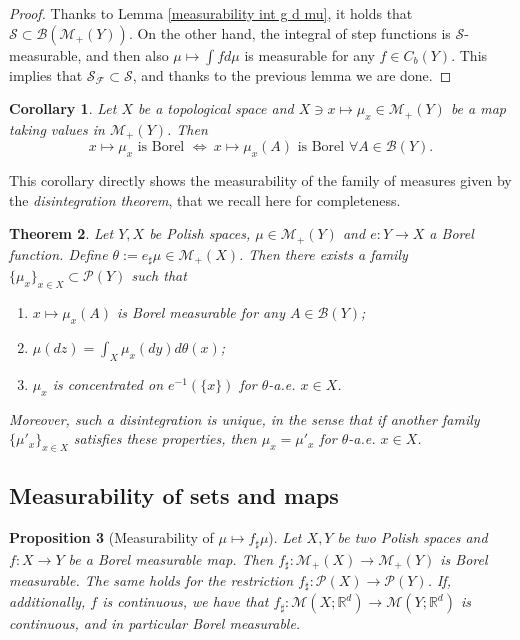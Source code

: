 \documentclass[10pt,leqno]{amsart}
\numberwithin{equation}{section}
\newtheorem{teorema}{Theorem}[section]
\newtheorem{prop}[teorema]{Proposition}
\newtheorem{co}[teorema]{Corollary}
\newcommand{\R}{\mathbb{R}}
\newcommand{\PP}{\mathcal{P}}
\begin{document}
\begin{proof}
    Thanks to Lemma \ref{measurability int g d mu}, it holds that $\mathcal{S}\subset \mathcal{B}(\mathcal{M}_+(Y))$. On the other hand, the integral of step functions is $\mathcal{S}$-measurable, and then also $\mu \mapsto \int fd\mu$ is measurable for any $f \in C_b(Y)$. This implies that $\mathcal{S}_\mathcal{F}\subset \mathcal{S}$, and thanks to the previous lemma we are done.
\end{proof}

\begin{co}\label{equiv of sigma alg cor}
    Let $X$ be a topological space and  $X \ni x \mapsto \mu_x \in \mathcal{M}_+(Y)$ be a map taking values in $\mathcal{M}_+(Y)$. Then 
    \[x\mapsto \mu_x \text{ is Borel } \iff  \ x\mapsto \mu_x(A) \text{ is Borel }\forall A\in \mathcal{B}(Y).\]
\end{co}

This corollary directly shows the measurability of the family of measures given by the \textit{disintegration theorem}, that we recall here for completeness.

\begin{teorema}\label{disintegration theorem}
    Let $Y,X$ be Polish spaces, $\mu\in \mathcal{M}_+(Y)$ and $e:Y\to X$ a Borel function. Define $\theta := e_\sharp \mu \in \mathcal{M}_+(X)$. Then there exists a family $\{\mu_x\}_{x\in X}\subset \PP(Y)$ such that 
    \begin{enumerate}
        \item[(i)] $x\mapsto \mu_x(A)$ is Borel measurable for any $A\in \mathcal{B}(Y)$;
        \item[(ii)] $\mu(dz) = \int_X \mu_x(dy) d\theta(x)$;
        \item[(iii)] $\mu_x$ is concentrated on $e^{-1}(\{x\})$ for $\theta$-a.e. $x\in X$.
    \end{enumerate}
Moreover, such a disintegration is unique, in the sense that if another family $\{\mu'_x\}_{x\in X}$ satisfies these properties, then $\mu_x = \mu'_x$ for $\theta$-a.e. $x\in X$. 
\end{teorema}







\subsection{Measurability of sets and maps}
\begin{prop}[Measurability of $\mu \mapsto f_\sharp \mu$]\label{meas of push forward}
    Let $X,Y$ be two Polish spaces and $f:X\to Y$ be a Borel measurable map. Then $f_\sharp :\mathcal{M}_+(X) \to \mathcal{M}_+(Y)$ is Borel measurable. The same holds for the restriction $f_\sharp :\PP(X) \to \PP(Y)$.
    If, additionally, $f$ is continuous, we have that $f_\sharp : \mathcal{M}(X;\R^d) \to \mathcal{M}(Y;\R^d)$ is continuous, and in particular Borel measurable.
\end{prop}
\end{document}
